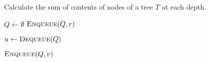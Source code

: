 
\begin{algorithm}[H]
  \caption{Calculate the sum of contents of nodes of a tree $T$ at each depth.}
  \label{alg:sum-at-depth}
  \begin{algorithmic}[1]
     
      \State {}

      \hStatex
      \State $Q \gets \emptyset$
      \State $\Call{Enqueue}{Q, r}$

      \hStatex
	\State $u \gets \Call{Dequeue}{Q}$
	\State {}

	\hStatex
	  \State {}
	  \State $\Call{Enqueue}{Q, v}$
	\EndFor
      \EndWhile
    \EndProcedure
  \end{algorithmic}
\end{algorithm}
